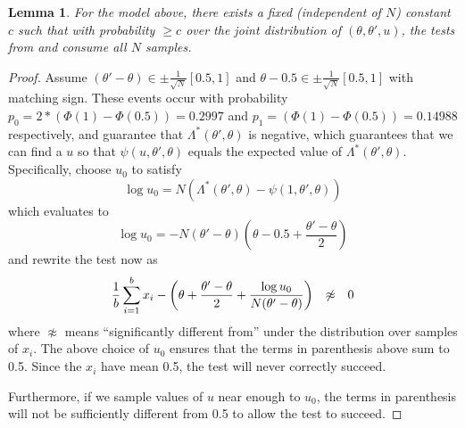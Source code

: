\documentclass{article}
\newtheorem{lemma}{Lemma}
\begin{document}
\begin{lemma}\label{lem:efficienty_cutting}
  For the model above, there
  exists a fixed (independent of $N$) constant $c$ such that with probability $ \geq c$ over the joint
  distribution of $(\theta, \theta', u)$, the
  tests from \cite{icml2014c1_bardenet14} and \cite{cutting_mh_2014} consume all $N$ samples. 
\end{lemma}

\begin{proof} Assume $(\theta' - \theta) \in \pm\frac{1}{\sqrt{N}}[0.5,1]$ and
  $\theta -0.5 \in \pm\frac{1}{\sqrt{N}}[0.5,1]$ with matching sign. These events
  occur with probability $p_0=2*(\Phi(1)-\Phi(0.5)) = 0.2997$ and $p_1=(\Phi(1)-\Phi(0.5))=0.14988$ respectively,
  and guarantee that $\Lambda^*(\theta',\theta)$ is negative, which guarantees that we can find
  a $u$ so that $\psi(u,\theta',\theta)$ equals the expected value of $\Lambda^*(\theta',\theta)$.
  Specifically, choose $u_0$
  to satisfy
  \begin{equation}
    \log u_0 = N(\Lambda^*(\theta',\theta)-\psi(1,\theta',\theta))
  \end{equation}
  which evaluates to 
  \begin{equation}
    \log u_0 = -N(\theta'-\theta)\left(\theta-0.5+\frac{\theta'-\theta}{2}\right) 
  \end{equation}
  and rewrite the test now as
  \begin{equation}
    \frac{1}{b}\sum_{i=1}^b x_i-\left(\theta+\frac{\theta'-\theta}{2} + \frac{\log u_0}{N(\theta'-\theta)}\right)
    \hspace{0.1in} \not\approx \hspace{0.1in} 0
  \end{equation}
  where $\not\approx$ means ``significantly different from'' under the distribution over samples of $x_i$. 
  The above choice of $u_0$ ensures that the terms in parenthesis above sum to 0.5. Since the $x_i$ have mean 0.5, the
  test will never correctly succeed.

  Furthermore, if we sample values of $u$ near enough to $u_0$, the terms in parenthesis will not be sufficiently different
  from 0.5 to allow the test to succeed. 
  

\end{proof}
\end{document}
